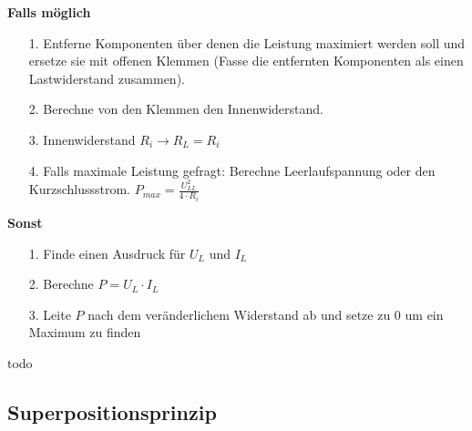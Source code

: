 																														\newpage
																														\beginvor
\textbf{Falls möglich}
\begin{itemize}
  \item [1. ] Entferne Komponenten über denen die Leistung maximiert werden soll und ersetze sie mit offenen Klemmen (Fasse die entfernten Komponenten als einen Lastwiderstand zusammen).
  \item [2. ] Berechne von den Klemmen den Innenwiderstand.
  \item [3. ] Innenwiderstand $R_i \rightarrow R_L = R_i$
  \item [4. ] Falls maximale Leistung gefragt: Berechne Leerlaufspannung oder den Kurzschlussstrom. $\displaystyle P_{max} = \frac{U_{LL}^2} {4 \cdot R_i } $
\end{itemize}

\textbf{Sonst}

\begin{itemize}
  \item [1. ] Finde einen Ausdruck für $U_L$ und $I_L$
	\item [2. ] Berechne $P = U_L \cdot I_L$
	\item [3. ] Leite $P$ nach dem veränderlichem Widerstand ab und setze zu 0 um ein Maximum zu finden
\end{itemize}


																														\iend

\beginbsp
todo
\iend









										\subsection{Superpositionsprinzip}

